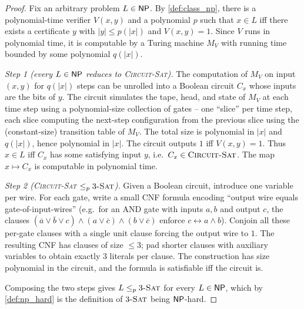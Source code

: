 \begin{proof}
\sketchproof Fix an arbitrary problem $L \in \mathsf{NP}$. By \cref{def:class_np}, there is a polynomial-time verifier $V(x, y)$ and a polynomial $p$ such that $x \in L$ iff there exists a certificate $y$ with $|y| \le p(|x|)$ and $V(x, y) = 1$. Since $V$ runs in polynomial time, it is computable by a Turing machine $M_V$ with running time bounded by some polynomial $q(|x|)$.

\medskip
\noindent\textit{Step 1 (every $L \in \mathsf{NP}$ reduces to \textsc{Circuit-Sat}).} The computation of $M_V$ on input $(x, y)$ for $q(|x|)$ steps can be unrolled into a Boolean circuit $C_x$ whose inputs are the bits of $y$. The circuit simulates the tape, head, and state of $M_V$ at each time step using a polynomial-size collection of gates -- one ``slice'' per time step, each slice computing the next-step configuration from the previous slice using the (constant-size) transition table of $M_V$. The total size is polynomial in $|x|$ and $q(|x|)$, hence polynomial in $|x|$. The circuit outputs $1$ iff $V(x, y) = 1$. Thus $x \in L$ iff $C_x$ has some satisfying input $y$, i.e.\ $C_x \in \textsc{Circuit-Sat}$. The map $x \mapsto C_x$ is computable in polynomial time.

\medskip
\noindent\textit{Step 2 (\textsc{Circuit-Sat} $\le_p 3\textsc{-Sat}$).} Given a Boolean circuit, introduce one variable per wire. For each gate, write a small CNF formula encoding ``output wire equals gate-of-input-wires'' (e.g.\ for an AND gate with inputs $a, b$ and output $c$, the clauses $(\overline{a} \vee \overline{b} \vee c) \wedge (a \vee \overline{c}) \wedge (b \vee \overline{c})$ enforce $c \leftrightarrow a \wedge b$). Conjoin all these per-gate clauses with a single unit clause forcing the output wire to $1$. The resulting CNF has clauses of size $\le 3$; pad shorter clauses with auxiliary variables to obtain exactly $3$ literals per clause. The construction has size polynomial in the circuit, and the formula is satisfiable iff the circuit is.

Composing the two steps gives $L \le_p 3\textsc{-Sat}$ for every $L \in \mathsf{NP}$, which by \cref{def:np_hard} is the definition of $3\textsc{-Sat}$ being $\mathsf{NP}$-hard.
\end{proof}


